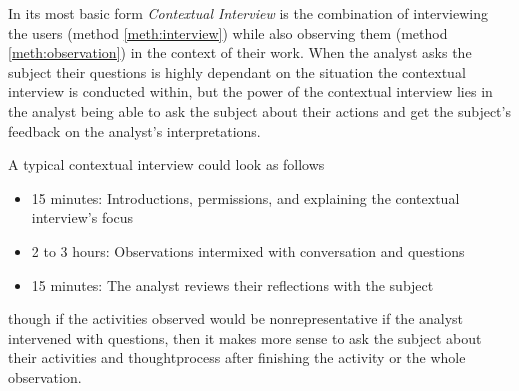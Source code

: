 \begin{method} \label{meth:contextual_interview} 
  In its most basic form \emph{Contextual Interview} is the combination of interviewing the users (method \ref{meth:interview}) while also observing them (method \ref{meth:observation}) in the context of their work. When the analyst asks the subject their questions is highly dependant on the situation the contextual interview is conducted within, but the power of the contextual interview lies in the analyst being able to ask the subject about their actions and get the subject's feedback on the analyst's interpretations. \cite[p. 273-276]{benyon10}

  A typical contextual interview could look as follows
  \begin{itemize}
    \item 15 minutes: Introductions, permissions, and explaining the contextual interview's focus
    \item 2 to 3 hours: Observations intermixed with conversation and questions
    \item 15 minutes: The analyst reviews their reflections with the subject
  \end{itemize}
  though if the activities observed would be nonrepresentative if the analyst intervened with questions, then it makes more sense to ask the subject about their activities and thoughtprocess after finishing the activity or the whole observation. \cite[p. 275-276]{benyon10}  
\end{method}
